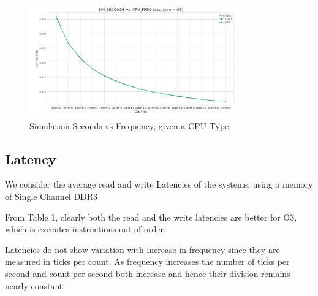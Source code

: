 \documentclass[12pt]{article}
\begin{document}
\begin{figure}[h!]
    \centering
    \includegraphics[width=0.8\textwidth]{sims_vs_freq_mem.png}
    \caption{Simulation Seconds vs Frequency, given a CPU Type}
\end{figure}

\subsection{Latency}

We consider the average read and write Latencies of the systems, using a memory of Single Channel DDR3
\begin{table}[h]
    \centering
    \caption{Variation of Latencies with CPU Types}
\end{table}

From Table 1, clearly both the read and the write latencies are better for O3, which is executes instructions out of order.

Latencies do not show variation with increase in frequency since they are measured in ticks per count. As frequency increases the number of ticks per second and count per second both increase and hence their division remains nearly constant.

\end{document}
